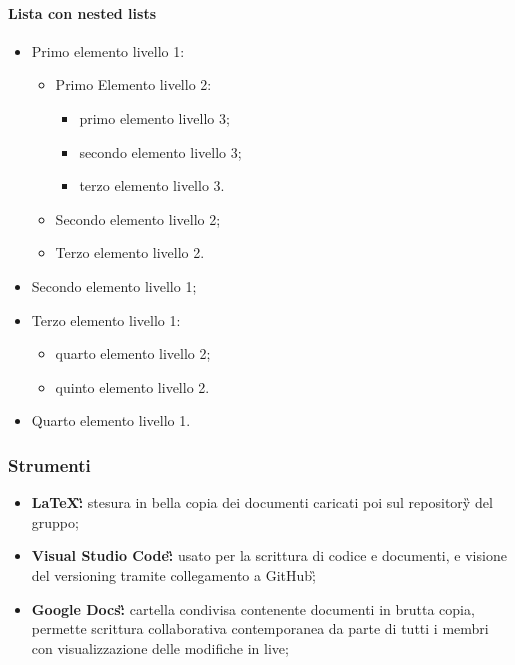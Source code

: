 		\paragraph*{Lista con nested lists}
		\begin{itemize}
			\item Primo elemento livello 1:
			\begin{itemize}
				\item Primo Elemento livello 2:
				\begin{itemize}
					\item primo elemento  livello 3;
					\item secondo elemento livello 3;
					\item terzo elemento livello 3.
				\end{itemize}
				\item Secondo elemento livello 2;
				\item Terzo elemento livello 2.
			\end{itemize}
			\item Secondo elemento livello 1;
			\item Terzo elemento livello 1:
			\begin{itemize}
				\item quarto elemento livello 2;
				\item quinto elemento livello 2.
			\end{itemize}
			\item Quarto elemento livello 1.
		\end{itemize}
		
		\subsubsection{Strumenti}
			\begin{itemize}
				\item \textbf{\LaTeX\G:} stesura in bella copia dei documenti caricati poi sul repository\G{} del gruppo;
				\item \textbf{Visual Studio Code\G:} usato per la scrittura di codice e documenti, e visione del versioning tramite collegamento a GitHub\G;
				\item \textbf{Google Docs\G:} cartella condivisa contenente documenti in brutta copia, permette scrittura collaborativa contemporanea da parte di tutti i membri con visualizzazione delle modifiche in live;
			\end{itemize}

